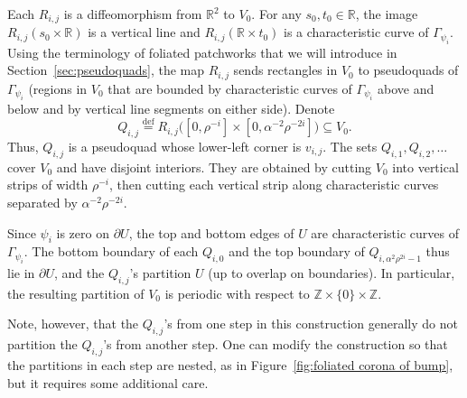 \documentclass[11pt,reqno]{amsart}
\newcommand{\R}{\mathbb{R}}
\newcommand{\Z}{\mathbb{Z}}
\newcommand{\0}{\mathbf{0}}
\renewcommand{\1}{\mathbf 1}
\renewcommand{\subset}{\subseteq}
\newcommand{\eqdef}{\stackrel{\mathrm{def}}{=}}
\theoremstyle{remark}
\begin{document}
Each $R_{i,j}$ is a diffeomorphism from $\R^2$ to $V_0$.
For any $s_0, t_0\in \R$, the image $R_{i,j}(s_0\times \R)$ is a vertical line and $R_{i,j}(\R \times t_0)$ is a characteristic curve of $\Gamma_{\psi_i}$.  Using the terminology of foliated patchworks that we will introduce in Section~\ref{sec:pseudoquads}, the map $R_{i,j}$ sends rectangles in $V_0$ to pseudoquads of $\Gamma_{\psi_i}$ (regions in $V_0$ that are bounded by characteristic curves of $\Gamma_{\psi_i}$  above and below and by vertical line segments on either side).  Denote
\begin{equation}\label{eq:def Qij}
Q_{i,j}\eqdef R_{i,j}\big([0,\rho^{-i}]\times [0,\alpha^{-2}\rho^{-2i}]\big)\subset V_0.
\end{equation}
Thus, $Q_{i,j}$ is a pseudoquad whose lower-left corner is $v_{i,j}$.  The sets $Q_{i,1},Q_{i,2},\ldots$ cover $V_0$ and have disjoint interiors.  They are obtained by cutting $V_0$ into vertical strips of width $\rho^{-i}$, then cutting each vertical strip along characteristic curves separated by $\alpha^{-2}\rho^{-2i}$.

Since $\psi_i$ is zero on $\partial U$, the top and bottom edges of $U$ are characteristic curves of $\Gamma_{\psi_i}$.  The bottom boundary of each $Q_{i,0}$ and the top boundary of $Q_{i,\alpha^2\rho^{2i}-1}$ thus lie in $\partial U$, and the $Q_{i,j}$'s partition $U$ (up to overlap on boundaries). In particular, the resulting partition of $V_0$ is periodic with respect to $\Z\times \{0\}\times \Z$.

Note, however, that the $Q_{i,j}$'s from one step in this construction generally do not partition the $Q_{i,j}$'s from another step. One can modify the construction so that the partitions in each step are nested, as in Figure~\ref{fig:foliated corona of bump}, but it requires some additional care.
\end{document}
